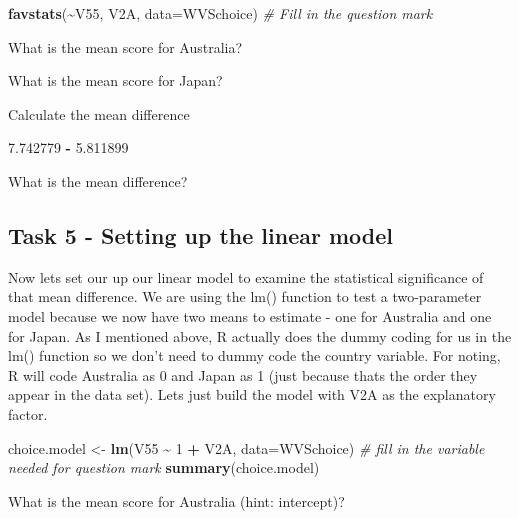\documentclass[
]{article}
\newenvironment{Shaded}{\begin{snugshade}}{\end{snugshade}}
\newcommand{\AttributeTok}[1]{\textcolor[rgb]{0.13,0.29,0.53}{#1}}
\newcommand{\CommentTok}[1]{\textcolor[rgb]{0.56,0.35,0.01}{\textit{#1}}}
\newcommand{\DecValTok}[1]{\textcolor[rgb]{0.00,0.00,0.81}{#1}}
\newcommand{\FloatTok}[1]{\textcolor[rgb]{0.00,0.00,0.81}{#1}}
\newcommand{\FunctionTok}[1]{\textcolor[rgb]{0.13,0.29,0.53}{\textbf{#1}}}
\newcommand{\NormalTok}[1]{#1}
\newcommand{\OtherTok}[1]{\textcolor[rgb]{0.56,0.35,0.01}{#1}}
\newcommand{\SpecialCharTok}[1]{\textcolor[rgb]{0.81,0.36,0.00}{\textbf{#1}}}
\begin{document}
\begin{Shaded}
\begin{Highlighting}[]
\FunctionTok{favstats}\NormalTok{(}\SpecialCharTok{\textasciitilde{}}\NormalTok{V55, V2A, }\AttributeTok{data=}\NormalTok{WVSchoice) }\CommentTok{\# Fill in the question mark}
\end{Highlighting}
\end{Shaded}

What is the mean score for Australia?

What is the mean score for Japan?

Calculate the mean difference

\begin{Shaded}
\begin{Highlighting}[]
\FloatTok{7.742779}    \SpecialCharTok{{-}} \FloatTok{5.811899}  
\end{Highlighting}
\end{Shaded}

What is the mean difference?

\subsection{Task 5 - Setting up the linear
model}\label{task-5---setting-up-the-linear-model}

Now lets set our up our linear model to examine the statistical
significance of that mean difference. We are using the lm() function to
test a two-parameter model because we now have two means to estimate -
one for Australia and one for Japan. As I mentioned above, R actually
does the dummy coding for us in the lm() function so we don't need to
dummy code the country variable. For noting, R will code Australia as 0
and Japan as 1 (just because thats the order they appear in the data
set). Lets just build the model with V2A as the explanatory factor.

\begin{Shaded}
\begin{Highlighting}[]
\NormalTok{choice.model }\OtherTok{\textless{}{-}} \FunctionTok{lm}\NormalTok{(V55 }\SpecialCharTok{\textasciitilde{}} \DecValTok{1} \SpecialCharTok{+}\NormalTok{ V2A, }\AttributeTok{data=}\NormalTok{WVSchoice) }\CommentTok{\# fill in the variable needed for question mark}
\FunctionTok{summary}\NormalTok{(choice.model)}
\end{Highlighting}
\end{Shaded}

What is the mean score for Australia (hint: intercept)?
\end{document}
